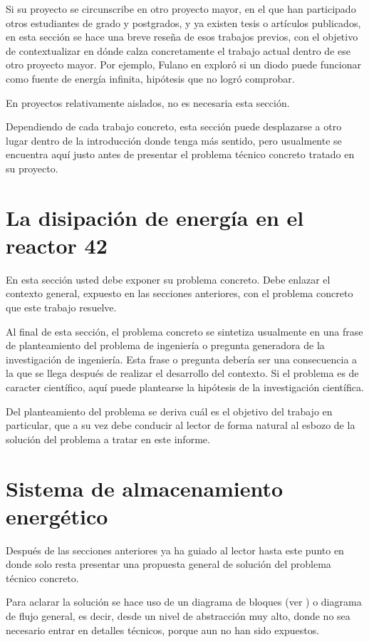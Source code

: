 Si su proyecto se circunscribe en otro proyecto mayor, en el que han
participado otros estudiantes de grado y postgrados, y ya existen
tesis o artículos publicados, en esta sección se hace una breve reseña
de esos trabajos previos, con el objetivo de contextualizar en dónde
calza concretamente el trabajo actual dentro de ese otro proyecto
mayor.  Por ejemplo, Fulano en exploró si un diodo
puede funcionar como fuente de energía infinita, hipótesis que no
logró comprobar.

En proyectos relativamente aislados, no es necesaria esta sección.

Dependiendo de cada trabajo concreto, esta sección puede desplazarse a
otro lugar dentro de la introducción donde tenga más sentido, pero
usualmente se encuentra aquí justo antes de presentar el problema
técnico concreto tratado en su proyecto.

\section{La disipación de energía en el reactor 42}

En esta sección usted debe exponer su problema concreto.  Debe enlazar
el contexto general, expuesto en las secciones anteriores, con el
problema concreto que este trabajo resuelve.

Al final de esta sección, el problema concreto se sintetiza usualmente
en una frase de planteamiento del problema de ingeniería o pregunta
generadora de la investigación de ingeniería. Esta frase o pregunta
debería ser una consecuencia a la que se llega después de realizar el
desarrollo del contexto.  Si el problema es de caracter científico,
aquí puede plantearse la hipótesis de la investigación científica.

Del planteamiento del problema se deriva cuál es el objetivo del
trabajo en particular, que a su vez debe conducir al lector de forma
natural al esbozo de la solución del problema a tratar en este
informe.

\section{Sistema de almacenamiento energético}

Después de las secciones anteriores ya ha guiado al lector hasta este
punto en donde solo resta presentar una propuesta general de solución
del problema técnico concreto.

Para aclarar la solución se hace uso de un diagrama de bloques (ver
) o diagrama de flujo general, es decir,
desde un nivel de abstracción muy alto, donde no sea necesario entrar
en detalles técnicos, porque aun no han sido expuestos.

